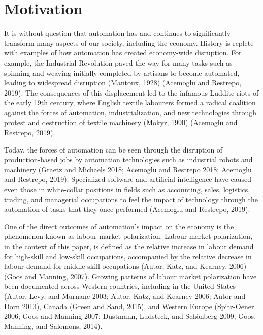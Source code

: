 \documentclass[undefended]{bumrp}
\begin{document}
%
\tableofcontents%
\clearpage

%
\listoftables%
\clearpage

%
\listoffigures%
\clearpage



\mainmatter%

\chapter{Motivation}

It is without question that automation has and continues to significantly transform many aspects of our society, including the economy. History is replete with examples of how automation has created economy-wide disruption. For example, the Industrial Revolution paved the way for many tasks such as spinning and weaving initially completed by artisans to become automated, leading to widespread disruption (Mantoux, 1928) (Acemoglu and Restrepo, 2019). The consequences of this displacement led to the infamous Luddite riots of the early 19th century, where English textile labourers formed a radical coalition against the forces of automation, industrialization, and new technologies through protest and destruction of textile machinery (Mokyr, 1990) (Acemoglu and Restrepo, 2019). 

Today, the forces of automation can be seen through the disruption of production-based jobs by automation technologies such as industrial robots and machinery (Graetz and Michaels 2018; Acemoglu and Restrepo 2018; Acemoglu and Restrepo, 2019). Specialized software and artificial intelligence have caused even those in white-collar positions in fields such as accounting, sales, logistics, trading, and managerial occupations to feel the impact of technology through the automation of tasks that they once performed (Acemoglu and Restrepo, 2019). 

One of the direct outcomes of automation’s impact on the economy is the phenomenon known as labour market polarization. Labour market polarization, in the context of this paper, is defined as the relative increase in labour demand for high-skill and low-skill occupations, accompanied by the relative decrease in labour demand for middle-skill occupations (Autor, Katz, and Kearney, 2006) (Goos and Manning, 2007). Growing patterns of labour market polarization have been documented across Western countries, including in the United States (Autor, Levy, and Murnane 2003; Autor, Katz, and Kearney 2006; Autor and Dorn 2013), Canada (Green and Sand, 2015), and Western Europe (Spitz-Oener 2006; Goos and Manning 2007; Dustmann, Ludsteck, and Schönberg 2009; Goos, Manning, and Salomons, 2014). 
\end{document}
